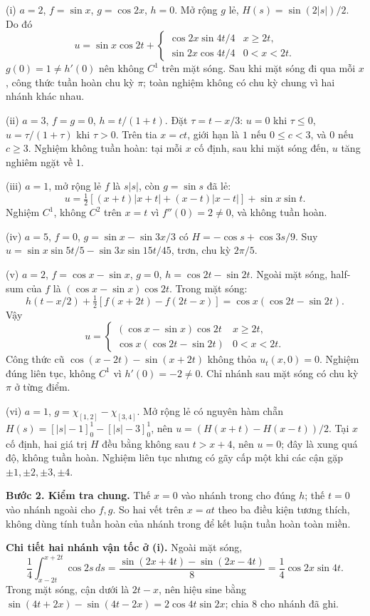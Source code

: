 \documentclass[10pt,a4paper]{article}
\begin{document}
(i) $a=2$, $f=\sin x$, $g=\cos2x$, $h=0$. Mở rộng $g$ lẻ, $H(s)=\sin(2|s|)/2$. Do đó
\[u=\sin x\cos2t+\begin{cases}\cos2x\sin4t/4&x\ge2t,\\\sin2x\cos4t/4&0<x<2t.\end{cases}\]
$g(0)=1\ne h'(0)$ nên không $C^1$ trên mặt sóng. Sau khi mặt sóng đi qua mỗi $x$, công thức tuần hoàn chu kỳ $\pi$; toàn nghiệm không có chu kỳ chung vì hai nhánh khác nhau.

(ii) $a=3$, $f=g=0$, $h=t/(1+t)$. Đặt $\tau=t-x/3$: $u=0$ khi $\tau\le0$, $u=\tau/(1+\tau)$ khi $\tau>0$. Trên tia $x=ct$, giới hạn là $1$ nếu $0\le c<3$, và $0$ nếu $c\ge3$. Nghiệm không tuần hoàn: tại mỗi $x$ cố định, sau khi mặt sóng đến, $u$ tăng nghiêm ngặt về $1$.

(iii) $a=1$, mở rộng lẻ $f$ là $s|s|$, còn $g=\sin s$ đã lẻ:
\[u=\tfrac12[(x+t)|x+t|+(x-t)|x-t|]+\sin x\sin t.\]
Nghiệm $C^1$, không $C^2$ trên $x=t$ vì $f''(0)=2\ne0$, và không tuần hoàn.

(iv) $a=5$, $f=0$, $g=\sin x-\sin3x/3$ có $H=-\cos s+\cos3s/9$. Suy $u=\sin x\sin5t/5-\sin3x\sin15t/45$, trơn, chu kỳ $2\pi/5$.

(v) $a=2$, $f=\cos x-\sin x$, $g=0$, $h=\cos2t-\sin2t$. Ngoài mặt sóng, half-sum của $f$ là $(\cos x-\sin x)\cos2t$. Trong mặt sóng:
\[h(t-x/2)+\tfrac12[f(x+2t)-f(2t-x)]=\cos x(\cos2t-\sin2t).\]
Vậy
\[u=\begin{cases}(\cos x-\sin x)\cos2t&x\ge2t,\\\cos x(\cos2t-\sin2t)&0<x<2t.\end{cases}\]
Công thức cũ $\cos(x-2t)-\sin(x+2t)$ không thỏa $u_t(x,0)=0$. Nghiệm đúng liên tục, không $C^1$ vì $h'(0)=-2\ne0$. Chỉ nhánh sau mặt sóng có chu kỳ $\pi$ ở từng điểm.

(vi) $a=1$, $g=\chi_{[1,2]}-\chi_{[3,4]}$. Mở rộng lẻ có nguyên hàm chẵn $H(s)=[|s|-1]_0^1-[|s|-3]_0^1$, nên $u=(H(x+t)-H(x-t))/2$. Tại $x$ cố định, hai giá trị $H$ đều bằng không sau $t>x+4$, nên $u=0$; đây là xung quá độ, không tuần hoàn. Nghiệm liên tục nhưng có gãy cấp một khi các cận gặp $\pm1,\pm2,\pm3,\pm4$.

\textbf{Bước 2. Kiểm tra chung.} Thế $x=0$ vào nhánh trong cho đúng $h$; thế $t=0$ vào nhánh ngoài cho $f,g$. So hai vết trên $x=at$ theo ba điều kiện tương thích, không dùng tính tuần hoàn của nhánh trong để kết luận tuần hoàn toàn miền.

\textbf{Chi tiết hai nhánh vận tốc ở (i).} Ngoài mặt sóng,
\[\frac14\int_{x-2t}^{x+2t}\cos2s\,ds
=\frac{\sin(2x+4t)-\sin(2x-4t)}8=\frac14\cos2x\sin4t.\]
Trong mặt sóng, cận dưới là $2t-x$, nên hiệu sine bằng $\sin(4t+2x)-\sin(4t-2x)=2\cos4t\sin2x$; chia $8$ cho nhánh đã ghi.
\end{document}
